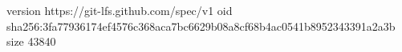 version https://git-lfs.github.com/spec/v1
oid sha256:3fa77936174ef4576c368aca7bc6629b08a8cf68b4ac0541b8952343391a2a3b
size 43840

